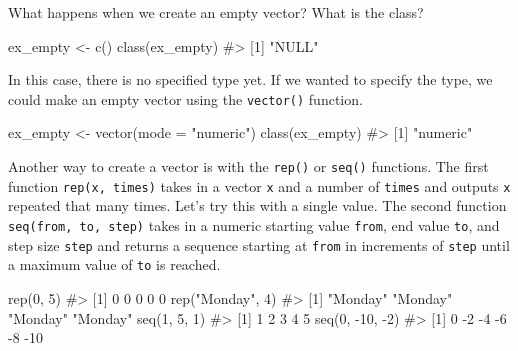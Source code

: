 \documentclass[
  letterpaper,
]{latex/krantz}
\makeatletter
\newenvironment{Shaded}{\begin{snugshade}}{\end{snugshade}}
\newcommand{\AttributeTok}[1]{\textcolor[rgb]{0.40,0.45,0.13}{#1}}
\newcommand{\CommentTok}[1]{\textcolor[rgb]{0.37,0.37,0.37}{#1}}
\newcommand{\DecValTok}[1]{\textcolor[rgb]{0.68,0.00,0.00}{#1}}
\newcommand{\FunctionTok}[1]{\textcolor[rgb]{0.28,0.35,0.67}{#1}}
\newcommand{\NormalTok}[1]{\textcolor[rgb]{0.00,0.23,0.31}{#1}}
\newcommand{\OtherTok}[1]{\textcolor[rgb]{0.00,0.23,0.31}{#1}}
\newcommand{\SpecialCharTok}[1]{\textcolor[rgb]{0.37,0.37,0.37}{#1}}
\newcommand{\StringTok}[1]{\textcolor[rgb]{0.13,0.47,0.30}{#1}}
\newenvironment{kframe}{%
\medskip{}
\setlength{\fboxsep}{.8em}
 \def\at@end@of@kframe{}%
 \ifinner\ifhmode%
  \def\at@end@of@kframe{\end{minipage}}%
  \begin{minipage}{\columnwidth}%
 \fi\fi%
 \def\FrameCommand##1{\hskip\@totalleftmargin \hskip-\fboxsep
 \colorbox{shadecolor}{##1}\hskip-\fboxsep
     \hskip-\linewidth \hskip-\@totalleftmargin \hskip\columnwidth}%
 \MakeFramed {\advance\hsize-\width
   \@totalleftmargin\z@ \linewidth\hsize
   \@setminipage}}%
 {\par\unskip\endMakeFramed%
 \at@end@of@kframe}
\renewenvironment{Shaded}{\begin{kframe}}{\end{kframe}}
\makeatother
\begin{document}
What happens when we create an empty vector? What is the class?

\begin{Shaded}
\begin{Highlighting}[]
\NormalTok{ex\_empty }\OtherTok{\textless{}{-}} \FunctionTok{c}\NormalTok{()}
\FunctionTok{class}\NormalTok{(ex\_empty)}
\CommentTok{\#\textgreater{} [1] "NULL"}
\end{Highlighting}
\end{Shaded}

In this case, there is no specified type yet. If we wanted to specify
the type, we could make an empty vector using the
\texttt{vector()}
function.

\begin{Shaded}
\begin{Highlighting}[]
\NormalTok{ex\_empty }\OtherTok{\textless{}{-}} \FunctionTok{vector}\NormalTok{(}\AttributeTok{mode =} \StringTok{"numeric"}\NormalTok{)}
\FunctionTok{class}\NormalTok{(ex\_empty)}
\CommentTok{\#\textgreater{} [1] "numeric"}
\end{Highlighting}
\end{Shaded}

Another way to create a vector is with the
\texttt{rep()} or
\texttt{seq()} functions. The
first function \texttt{rep(x,\ times)} takes in a vector \texttt{x} and
a number of \texttt{times} and outputs \texttt{x} repeated that many
times. Let's try this with a single value. The second function
\texttt{seq(from,\ to,\ step)} takes in a numeric starting value
\texttt{from}, end value \texttt{to}, and step size \texttt{step} and
returns a sequence starting at \texttt{from} in increments of
\texttt{step} until a maximum value of \texttt{to} is reached.

\begin{Shaded}
\begin{Highlighting}[]
\FunctionTok{rep}\NormalTok{(}\DecValTok{0}\NormalTok{, }\DecValTok{5}\NormalTok{)}
\CommentTok{\#\textgreater{} [1] 0 0 0 0 0}
\FunctionTok{rep}\NormalTok{(}\StringTok{"Monday"}\NormalTok{, }\DecValTok{4}\NormalTok{)}
\CommentTok{\#\textgreater{} [1] "Monday" "Monday" "Monday" "Monday"}
\FunctionTok{seq}\NormalTok{(}\DecValTok{1}\NormalTok{, }\DecValTok{5}\NormalTok{, }\DecValTok{1}\NormalTok{)}
\CommentTok{\#\textgreater{} [1] 1 2 3 4 5}
\FunctionTok{seq}\NormalTok{(}\DecValTok{0}\NormalTok{, }\SpecialCharTok{{-}}\DecValTok{10}\NormalTok{, }\SpecialCharTok{{-}}\DecValTok{2}\NormalTok{)}
\CommentTok{\#\textgreater{} [1]   0  {-}2  {-}4  {-}6  {-}8 {-}10}
\end{Highlighting}
\end{Shaded}
\end{document}
